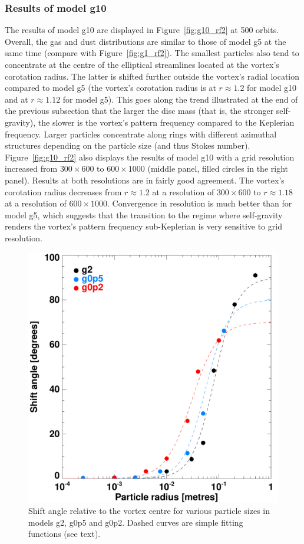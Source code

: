 \documentclass[a4paper,usenatbib]{mnras}
\begin{document}
\subsubsection{Results of model g10}
\label{sec:g10}
The results of model g10 are displayed in Figure~\ref{fig:g10_rf2} at
500 orbits. Overall, the gas and dust distributions are similar to
those of model g5 at the same time (compare with
Figure~\ref{fig:g1_rf2}). The smallest particles also tend to
concentrate at the centre of the elliptical streamlines located at the
vortex's corotation radius. The latter is shifted further outside the
vortex's radial location compared to model g5 (the vortex's corotation
radius is at $r \approx 1.2$ for model g10 and at $r \approx 1.12$ for
model g5). This goes along the trend illustrated at the end of the
previous subsection that the larger the disc mass (that is, the
stronger self-gravity), the slower is the vortex's pattern frequency
compared to the Keplerian frequency. Larger particles concentrate
along rings with different azimuthal structures depending on the
particle size (and thus Stokes number). Figure~\ref{fig:g10_rf2} also
displays the results of model g10 with a grid resolution increased
from $300\times600$ to $600\times1000$ (middle panel, filled circles
in the right panel). Results at both resolutions are in fairly good
agreement.  The vortex's corotation radius decreases from $r \approx
1.2$ at a resolution of $300\times600$ to $r \approx 1.18$ at a
resolution of $600\times1000$. Convergence in resolution is much
better than for model g5, which suggests that the transition to the
regime where self-gravity renders the vortex's pattern frequency
sub-Keplerian is very sensitive to grid resolution.
\begin{figure}
\centering
\includegraphics[width=0.83\hsize]{f9.pdf}
\caption{\label{fig:depth} Shift angle relative to the vortex centre
  for various particle sizes in models g2, g0p5 and g0p2. Dashed
  curves are simple fitting functions (see text).  }
\end{figure}
\end{document}
